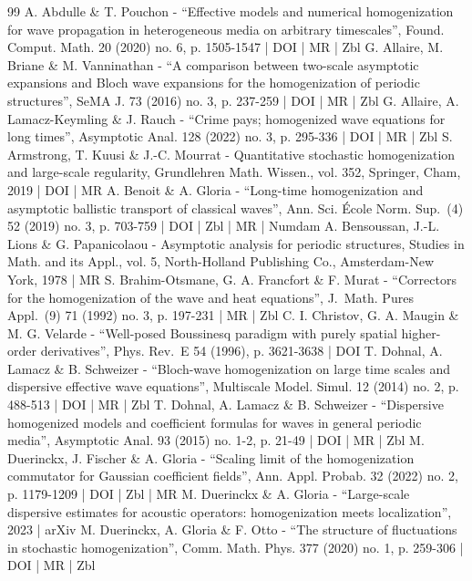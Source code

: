\documentclass[10pt]{amsart}
\theoremstyle{plain}
\theoremstyle{definition}
\numberwithin{equation}{section}
\begin{document}
\begin{thebibliography}{99}
A. Abdulle \& T. Pouchon - “Effective models and numerical homogenization for wave propagation in heterogeneous media on arbitrary timescales”, Found. Comput. Math. 20 (2020) no. 6, p. 1505-1547 | DOI | MR | Zbl
G. Allaire, M. Briane \& M. Vanninathan - “A comparison between two-scale asymptotic expansions and Bloch wave expansions for the homogenization of periodic structures”, SeMA J. 73 (2016) no. 3, p. 237-259 | DOI | MR | Zbl
G. Allaire, A. Lamacz-Keymling \& J. Rauch - “Crime pays; homogenized wave equations for long times”, Asymptotic Anal. 128 (2022) no. 3, p. 295-336 | DOI | MR | Zbl
S. Armstrong, T. Kuusi \& J.-C. Mourrat - Quantitative stochastic homogenization and large-scale regularity, Grundlehren Math. Wissen., vol. 352, Springer, Cham, 2019 | DOI | MR
A. Benoit \& A. Gloria - “Long-time homogenization and asymptotic ballistic transport of classical waves”, Ann. Sci. École Norm. Sup. (4) 52 (2019) no. 3, p. 703-759 | DOI | Zbl | MR | Numdam
A. Bensoussan, J.-L. Lions \& G. Papanicolaou - Asymptotic analysis for periodic structures, Studies in Math. and its Appl., vol. 5, North-Holland Publishing Co., Amsterdam-New York, 1978 | MR
S. Brahim-Otsmane, G. A. Francfort \& F. Murat - “Correctors for the homogenization of the wave and heat equations”, J. Math. Pures Appl. (9) 71 (1992) no. 3, p. 197-231 | MR | Zbl
C. I. Christov, G. A. Maugin \& M. G. Velarde - “Well-posed Boussinesq paradigm with purely spatial higher-order derivatives”, Phys. Rev. E 54 (1996), p. 3621-3638 | DOI
T. Dohnal, A. Lamacz \& B. Schweizer - “Bloch-wave homogenization on large time scales and dispersive effective wave equations”, Multiscale Model. Simul. 12 (2014) no. 2, p. 488-513 | DOI | MR | Zbl
T. Dohnal, A. Lamacz \& B. Schweizer - “Dispersive homogenized models and coefficient formulas for waves in general periodic media”, Asymptotic Anal. 93 (2015) no. 1-2, p. 21-49 | DOI | MR | Zbl
M. Duerinckx, J. Fischer \& A. Gloria - “Scaling limit of the homogenization commutator for Gaussian coefficient fields”, Ann. Appl. Probab. 32 (2022) no. 2, p. 1179-1209 | DOI | Zbl | MR
M. Duerinckx \& A. Gloria - “Large-scale dispersive estimates for acoustic operators: homogenization meets localization”, 2023 | arXiv
M. Duerinckx, A. Gloria \& F. Otto - “The structure of fluctuations in stochastic homogenization”, Comm. Math. Phys. 377 (2020) no. 1, p. 259-306 | DOI | MR | Zbl

\end{thebibliography}
\end{document}
